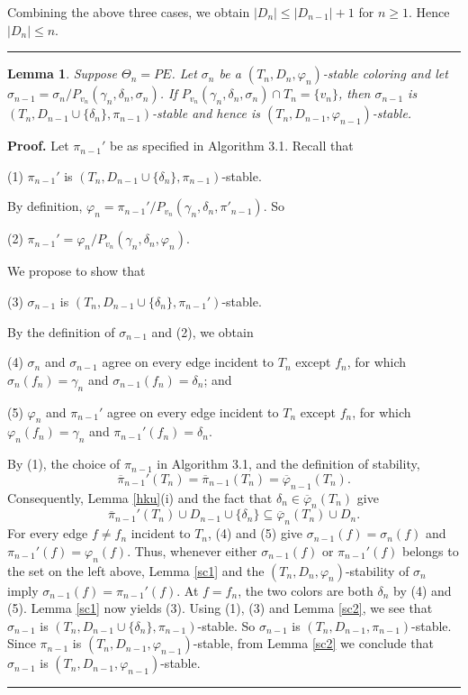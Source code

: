 \documentclass[11pt]{article}
\newtheorem{lemma}[theorem]{Lemma}
\newcommand{\phibar}{\overline{\varphi}}
\newcommand{\phiv}{\varphi}
\def\qed{\hfill \rule{4pt}{7pt}}
\begin{document}
Combining the above three cases, we obtain $|D_n|\leq |D_{n-1}|+1$ for $n\ge 1$.  Hence $|D_n|\leq n$. \qed

\begin{lemma}\label{stablezang}
Suppose $\Theta_n=PE$. Let $\sigma_n$ be a $(T_n, D_n, \phiv_n)$-stable coloring and let 
$\sigma_{n-1}=\sigma_n/P_{v_{n}} (\gamma_{n},\delta_{n}, \sigma_n)$. If $P_{v_{n}}(\gamma_{n},\delta_{n},\sigma_n)
\cap T_{n}=\{v_{n}\}$, then $\sigma_{n-1}$ is  $(T_n, D_{n-1} \cup \{\delta_n\}, \pi_{n-1})$-stable
and hence is $(T_{n},D_{n-1}, \varphi_{n-1})$-stable. 
\end{lemma}


{\bf Proof.} Let $\pi_{n-1}'$ be as specified in Algorithm 3.1. Recall that 

(1) $\pi_{n-1}'$ is $(T_n, D_{n-1} \cup \{\delta_n\}, \pi_{n-1})$-stable. 

\noindent By definition, $\phiv_n = \pi_{n-1}'/P_{v_n}(\gamma_n, \delta_n, \pi'_{n-1})$. So 

(2) $\pi_{n-1}' =  \phiv_n /P_{v_n}( \gamma_n, \delta_n, \phiv_n)$.

We propose to show that 

(3) $\sigma_{n-1}$ is $(T_n, D_{n-1} \cup \{\delta_n\}, \pi_{n-1}')$-stable. 

By the definition of $\sigma_{n-1}$ and (2), we obtain

(4) $\sigma_n$ and $\sigma_{n-1}$ agree on every edge incident to $T_n$ except $f_n$, for which $\sigma_n(f_n)=\gamma_n$ 
and $\sigma_{n-1}(f_n)=\delta_n$; and

(5) $\varphi_n$ and $\pi_{n-1}'$ agree on every edge incident to $T_n$ except $f_n$, for which $\varphi_n(f_n)=\gamma_n$ 
and $\pi_{n-1}'(f_n)=\delta_n$. 

By (1), the choice of $\pi_{n-1}$ in Algorithm 3.1, and the definition of stability,
\[
\overline{\pi}_{n-1}'(T_n)=\overline{\pi}_{n-1}(T_n)=\phibar_{n-1}(T_n).
\]
Consequently, Lemma \ref{hku}(i) and the fact that $\delta_n\in\phibar_n(T_n)$ give
\[
\overline{\pi}_{n-1}'(T_n)\cup D_{n-1}\cup\{\delta_n\}
\subseteq \phibar_n(T_n)\cup D_n.
\]
For every edge $f\ne f_n$ incident to $T_n$, (4) and (5) give
$\sigma_{n-1}(f)=\sigma_n(f)$ and $\pi_{n-1}'(f)=\varphi_n(f)$. Thus, whenever either
$\sigma_{n-1}(f)$ or $\pi_{n-1}'(f)$ belongs to the set on the left above, Lemma \ref{sc1} and the
$(T_n,D_n,\varphi_n)$-stability of $\sigma_n$ imply
$\sigma_{n-1}(f)=\pi_{n-1}'(f)$. At $f=f_n$, the two colors are both $\delta_n$ by (4) and (5).
Lemma \ref{sc1} now yields (3). 
Using (1), (3) and Lemma \ref{sc2}, we see that $\sigma_{n-1}$ is $(T_{n},D_{n-1} \cup \{\delta_n\}, \pi_{n-1})$-stable. So $\sigma_{n-1}$ is $(T_{n},
D_{n-1}, \pi_{n-1})$-stable. Since $\pi_{n-1}$ is $(T_{n},D_{n-1}, \varphi_{n-1})$-stable, from  Lemma \ref{sc2}
we conclude that $\sigma_{n-1}$ is $(T_{n},D_{n-1}, \varphi_{n-1})$-stable. \qed\\
\end{document}

